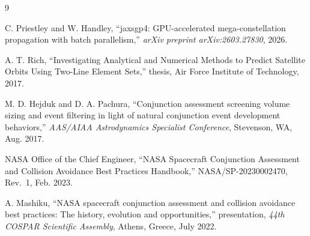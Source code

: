 \documentclass[11pt,a4paper]{article}
\begin{document}
\begin{thebibliography}{9}

C. Priestley and W. Handley,
``jaxsgp4: GPU-accelerated mega-constellation propagation with batch parallelism,''
\emph{arXiv preprint arXiv:2603.27830}, 2026.

A. T. Rich,
``Investigating Analytical and Numerical Methods to Predict Satellite Orbits Using Two-Line Element Sets,''
thesis, Air Force Institute of Technology, 2017.

M. D. Hejduk and D. A. Pachura,
``Conjunction assessment screening volume sizing and event filtering in light of natural conjunction event development behaviors,''
\emph{AAS/AIAA Astrodynamics Specialist Conference}, Stevenson, WA, Aug. 2017.

NASA Office of the Chief Engineer,
``NASA Spacecraft Conjunction Assessment and Collision Avoidance Best Practices Handbook,''
NASA/SP-20230002470, Rev.~1, Feb. 2023.

A. Mashiku,
``NASA spacecraft conjunction assessment and collision avoidance best practices: The history, evolution and opportunities,''
presentation, \emph{44th COSPAR Scientific Assembly}, Athens, Greece, July 2022.

\end{thebibliography}
\end{document}

